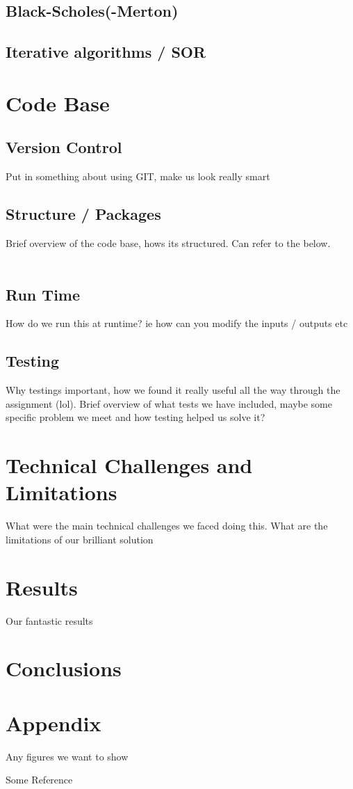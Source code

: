 \documentclass[paper=a4, fontsize=10pt]{scrartcl} %
\begin{document}
\subsection {Black-Scholes(-Merton)}
\subsection {Iterative algorithms / SOR}
\clearpage
\section{Code Base}
\subsection {Version Control}
{Put in something about using GIT, make us look really smart}
\subsection {Structure / Packages}
{Brief overview of the code base, hows its structured. Can refer to the below.}\\\\
\subsection {Run Time}
{How do we run this at runtime? ie how can you modify the inputs / outputs etc}
\subsection {Testing}
{Why testings important, how we found it really useful all the way through the assignment (lol). Brief overview of what tests we have included, maybe some specific problem we meet and how testing helped us solve it?}
\clearpage
\section{Technical Challenges and Limitations}
{What were the main technical challenges we faced doing this. What are the limitations of our brilliant solution }
\clearpage
\section{Results}
{Our fantastic results}
\clearpage
\section{Conclusions}
\clearpage
\section*{Appendix}
{Any figures we want to show}
\clearpage
\begin{thebibliography}{9}
Some Reference
 
\end{thebibliography}
\end{document}
